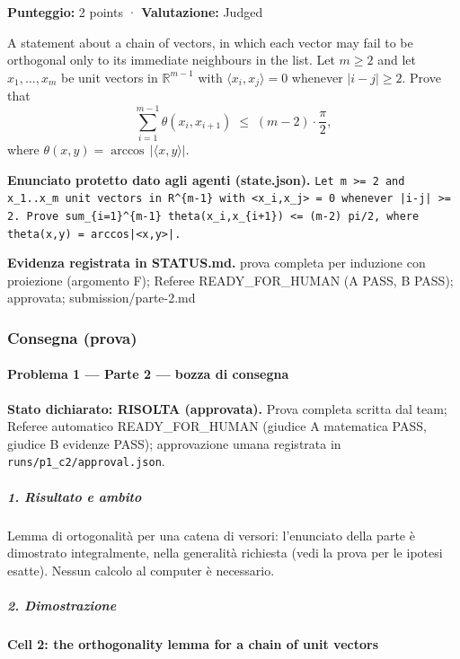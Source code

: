 \documentclass[11pt,a4paper]{article}
\begin{document}
\textbf{Punteggio:} 2 points · \textbf{Valutazione:} Judged

A statement about a chain of vectors, in which each vector may fail to
be orthogonal only to its immediate neighbours in the list. Let
\(m \ge 2\) and let \(x_1, \ldots, x_m\) be unit vectors in
\(\mathbb{R}^{m-1}\) with \(\langle x_i, x_j \rangle = 0\) whenever
\(|i - j| \ge 2\). Prove that \[
\sum_{i=1}^{m-1} \theta(x_i, x_{i+1}) \;\le\; (m-2) \cdot \frac{\pi}{2},
\] where \(\theta(x,y) = \arccos\,\lvert \langle x, y \rangle \rvert\).

\textbf{Enunciato protetto dato agli agenti (state.json).} \texttt{Let m \textgreater{}= 2 and x\_1..x\_m unit vectors in R\textasciicircum{}\{m-1\} with \textless{}x\_i,x\_j\textgreater{} = 0 whenever |i-j| \textgreater{}= 2. Prove sum\_\{i=1\}\textasciicircum{}\{m-1\} theta(x\_i,x\_\{i+1\}) \textless{}= (m-2) pi/2, where theta(x,y) = arccos|\textless{}x,y\textgreater{}|.}

\textbf{Evidenza registrata in STATUS.md.} prova completa per induzione con proiezione (argomento F); Referee READY\_FOR\_HUMAN (A PASS, B PASS); approvata; submission/parte-2.md

\subsubsection{Consegna (prova)}
\paragraph{Problema 1 --- Parte 2 --- bozza di
consegna}\label{problema-1-parte-2-bozza-di-consegna}

\textbf{Stato dichiarato: RISOLTA (approvata).} Prova completa scritta
dal team; Referee automatico READY\_FOR\_HUMAN (giudice A matematica
PASS, giudice B evidenze PASS); approvazione umana registrata in
\texttt{runs/p1\_c2/approval.json}.

\subparagraph{1. Risultato e ambito}\label{risultato-e-ambito}

Lemma di ortogonalità per una catena di versori: l'enunciato della parte
è dimostrato integralmente, nella generalità richiesta (vedi la prova
per le ipotesi esatte). Nessun calcolo al computer è necessario.

\subparagraph{2. Dimostrazione}\label{dimostrazione}

\paragraph{Cell 2: the orthogonality lemma for a chain of unit
vectors}\label{cell-2-the-orthogonality-lemma-for-a-chain-of-unit-vectors}
\end{document}
